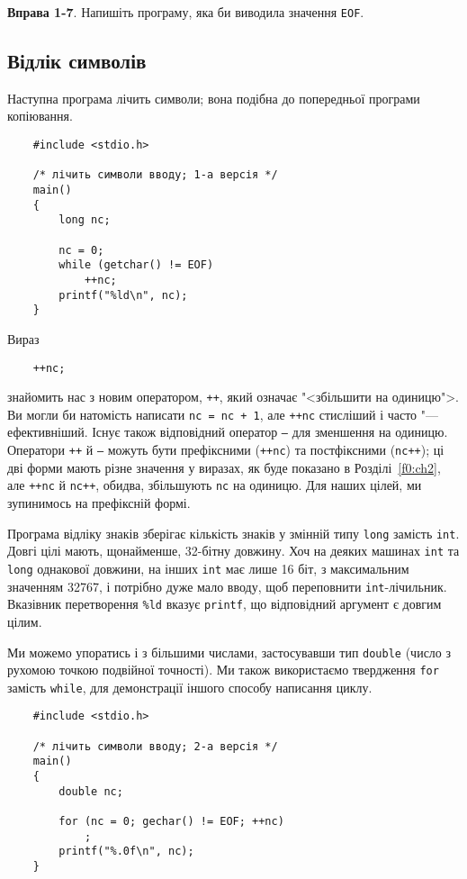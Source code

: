 \documentclass[a4paper,12pt]{book}
\begin{document}
  \textbf{Вправа 1-7}. Напишіть програму, яка би виводила значення \texttt{EOF}.

\subsection{Відлік символів}


  Наступна програма лічить символи; вона подібна до попередньої програми копіювання.
  \begin{verbatim}
    #include <stdio.h>

    /* лічить символи вводу; 1-а версія */
    main()
    {
        long nc;

        nc = 0;
        while (getchar() != EOF)
            ++nc;
        printf("%ld\n", nc);
    }
  \end{verbatim}

  Вираз
  \begin{verbatim}
    ++nc;
  \end{verbatim}
  знайомить нас з новим оператором, \texttt{++}, який означає "<збільшити на одиницю">. Ви
  могли би натомість написати \texttt{nc = nc + 1}, але \texttt{++nc} стисліший і часто
  "--- ефективніший. Існує також відповідний оператор \texttt{--} для зменшення на
  одиницю. Оператори \texttt{++} й \texttt{--} можуть бути префіксними (\texttt{++nc}) та
  постфіксними (\texttt{nc++}); ці дві форми мають різне значення у виразах, як буде
  показано в Розділі~\ref{f0:ch2}, але \texttt{++nc} й \texttt{nc++},
  обидва, збільшують \texttt{nc} на одиницю. Для наших цілей, ми зупинимось на префіксній
  формі.

  Програма відліку знаків зберігає кількість знаків у змінній типу \texttt{long} замість
  \texttt{int}. Довгі цілі мають, щонайменше, 32-бітну довжину. Хоч на деяких машинах
  \texttt{int} та \texttt{long} однакової довжини, на інших \texttt{int} має лише 16 біт,
  з максимальним значенням 32767, і потрібно дуже мало вводу, щоб переповнити
  \texttt{int}-лічильник. Вказівник перетворення \texttt{\%ld} вказує \texttt{printf}, що
  відповідний аргумент є довгим цілим.

  Ми можемо упоратись і з більшими числами, застосувавши тип \texttt{double} (число з
  рухомою точкою подвійної точності). Ми також використаємо твердження \texttt{for}
  замість \texttt{while}, для демонстрації іншого способу написання циклу.

  \begin{verbatim}
    #include <stdio.h>

    /* лічить символи вводу; 2-а версія */
    main()
    {
        double nc;

        for (nc = 0; gechar() != EOF; ++nc)
            ;
        printf("%.0f\n", nc);
    }
  \end{verbatim}
\end{document}
